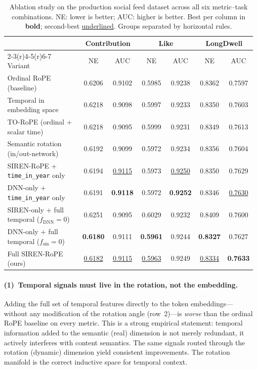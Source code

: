 \documentclass{article}
\begin{document}
\begin{table}[t]
  \caption{Ablation study on the production social feed dataset across all
    six metric--task combinations. NE: lower is better; AUC: higher is
    better. Best per column in \textbf{bold}; second-best
    \underline{underlined}. Groups separated by horizontal rules.}
  \label{tab:ablation}
  \centering
  \small
  \begin{tabular}{lcccccc}
    \toprule
    & \multicolumn{2}{c}{Contribution} & \multicolumn{2}{c}{Like}
    & \multicolumn{2}{c}{LongDwell} \\
    \cmidrule(r){2-3}\cmidrule(r){4-5}\cmidrule(r){6-7}
    Variant & NE & AUC & NE & AUC & NE & AUC \\
    \midrule
    Ordinal RoPE (baseline)          & 0.6206 & 0.9102 & 0.5985 & 0.9238 & 0.8362 & 0.7597 \\
    Temporal in embedding space      & 0.6218 & 0.9098 & 0.5997 & 0.9233 & 0.8350 & 0.7603 \\
    \midrule
    TO-RoPE (ordinal + scalar time)  & 0.6218 & 0.9095 & 0.5999 & 0.9231 & 0.8349 & 0.7613 \\
    \midrule
    Semantic rotation (in/out-network) & 0.6192 & 0.9099 & 0.5972 & 0.9234 & 0.8356 & 0.7604 \\
    \midrule
    SIREN-RoPE + \texttt{time\_in\_year} only           & 0.6194 & \underline{0.9115} & 0.5973 & \underline{0.9250} & 0.8350 & 0.7629 \\
    DNN-only + \texttt{time\_in\_year} only            & 0.6191 & \textbf{0.9118}   & 0.5972 & \textbf{0.9252}   & 0.8346 & \underline{0.7630} \\
    SIREN-only + full temporal ($f_{\mathrm{DNN}}\!=\!0$)  & 0.6251 & 0.9095 & 0.6029 & 0.9232 & 0.8409 & 0.7600 \\
    DNN-only + full temporal ($f_{\mathrm{sin}}\!=\!0$)    & \textbf{0.6180} & 0.9111 & \textbf{0.5961} & 0.9244 & \textbf{0.8327} & 0.7627 \\
    Full SIREN-RoPE (ours)                              & \underline{0.6182} & \underline{0.9115} & \underline{0.5963} & 0.9249 & \underline{0.8334} & \textbf{0.7633} \\
    \bottomrule
  \end{tabular}
\end{table}

\paragraph{(1)~Temporal signals must live in the rotation, not the embedding.}
Adding the full set of temporal features directly to the token embeddings---without
any modification of the rotation angle (row~2)---is \emph{worse} than the
ordinal RoPE baseline on every metric. This is a strong empirical statement:
temporal information added to the semantic (real) dimension is not merely
redundant, it actively interferes with content semantics. The same signals
routed through the rotation (dynamic) dimension yield consistent improvements.
The rotation manifold is the correct inductive space for temporal context.
\end{document}
